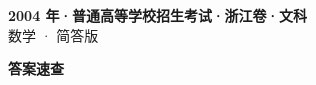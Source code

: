\documentclass[zihao=-4, a4paper]{ctexart}
\begin{document}
\begin{center}
  {\Large\bfseries 2004 年·普通高等学校招生考试·浙江卷·文科}\\[4pt]
  {\large 数学 · 简答版}
\end{center}
\medskip
{}

\clearpage
{}
\begin{center}{\Large\bfseries 答案速查}\end{center}
\medskip

\end{document}
